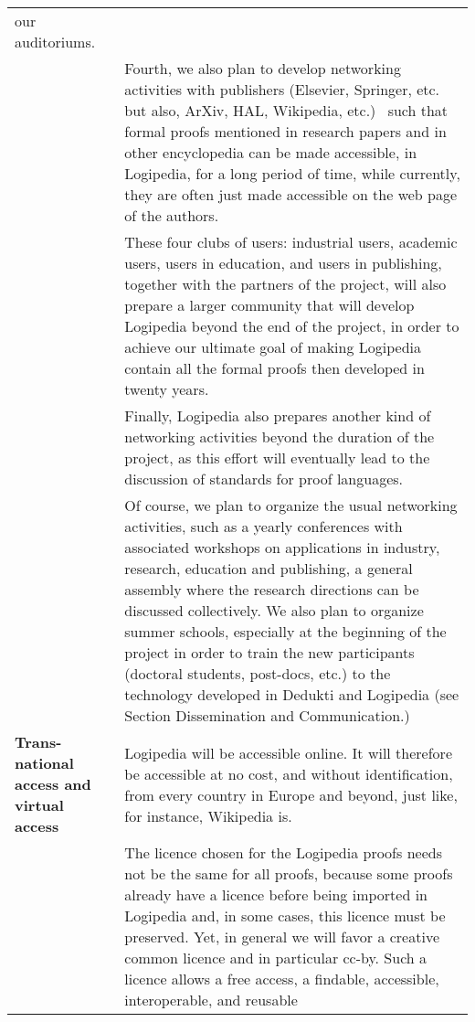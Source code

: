 \begin{longtable}{|p{}|p{}|}
our auditoriums.\\
&
\hspace{0.4cm}
Fourth, we also plan to develop networking activities with publishers
(Elsevier, Springer, etc. but also, ArXiv, HAL, Wikipedia, etc.)~
such that formal proofs mentioned in research papers and in
other encyclopedia can be made accessible, in Logipedia, for a long
period of time, while currently, they are often just made accessible
on the web page of the authors.\\
&
\hspace{0.4cm}
These four clubs of users: industrial users, academic users, users in 
education, and users in publishing, together with the partners of the 
project, will also
prepare a larger community that will develop Logipedia beyond the end
of the project, in order to achieve our ultimate goal of making
Logipedia contain all the formal proofs then developed in twenty
years.\\
&
\hspace{0.4cm}
Finally, Logipedia also prepares another kind of networking activities
beyond the duration of the project, as this effort will eventually
lead to the discussion of standards for proof languages.\\
&
\hspace{0.4cm}
Of course, we plan to organize the usual networking activities,
such as a yearly conferences with associated workshops on applications
in industry, research, education and publishing, a general assembly
where the research directions can be discussed collectively. We also plan to organize
summer schools, especially at the beginning of the project in order to
train the new participants (doctoral students, post-docs, etc.) to the
technology developed in Dedukti and Logipedia
(see Section Dissemination and Communication.)\\
\hline
{\bf Trans-national access and virtual access}
&
Logipedia will be accessible online. It will therefore be accessible
at no cost, and without identification, from every country in Europe
and beyond, just like, for instance, Wikipedia is.\\
&
\hspace{0.4cm}
The licence chosen for the Logipedia proofs needs not be the same for
all proofs, because some proofs already have a licence before being
imported in Logipedia and, in some cases, this licence must be
preserved.  Yet, in general we will favor a creative common licence
and in particular cc-by.  Such a licence allows a free
access, a findable, accessible, interoperable, and reusable

\end{longtable}
